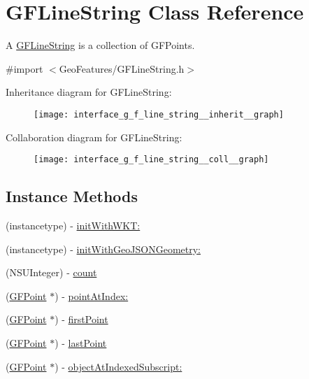 \hypertarget{interface_g_f_line_string}{}\section{G\+F\+Line\+String Class Reference}
\label{interface_g_f_line_string}


A \hyperlink{interface_g_f_line_string}{G\+F\+Line\+String} is a collection of G\+F\+Points.  




{\ttfamily \#import $<$Geo\+Features/\+G\+F\+Line\+String.\+h$>$}



Inheritance diagram for G\+F\+Line\+String\+:\nopagebreak
\begin{figure}[H]
\begin{center}
\leavevmode
\texttt{[image: interface\_g\_f\_line\_string\_\_inherit\_\_graph]}
\end{center}
\end{figure}


Collaboration diagram for G\+F\+Line\+String\+:\nopagebreak
\begin{figure}[H]
\begin{center}
\leavevmode
\texttt{[image: interface\_g\_f\_line\_string\_\_coll\_\_graph]}
\end{center}
\end{figure}
\subsection*{Instance Methods}
\begin{DoxyCompactItemize}
\item 
(instancetype) -\/ \hyperlink{interface_g_f_line_string_a261a4d08fe5cb35f935d265c3a97f453}{init\+With\+W\+K\+T\+:}
\item 
(instancetype) -\/ \hyperlink{interface_g_f_line_string_ad7a913bc12b6099982229190d1debd71}{init\+With\+Geo\+J\+S\+O\+N\+Geometry\+:}
\item 
(N\+S\+U\+Integer) -\/ \hyperlink{interface_g_f_line_string_a58fc2980cff73581d57943a64d60ddba}{count}
\item 
(\hyperlink{interface_g_f_point}{G\+F\+Point} $\ast$) -\/ \hyperlink{interface_g_f_line_string_a51963123a916fd666131859f571e2609}{point\+At\+Index\+:}
\item 
(\hyperlink{interface_g_f_point}{G\+F\+Point} $\ast$) -\/ \hyperlink{interface_g_f_line_string_a1fc7f9d3388d5237cb824573e8f6f71f}{first\+Point}
\item 
(\hyperlink{interface_g_f_point}{G\+F\+Point} $\ast$) -\/ \hyperlink{interface_g_f_line_string_aa9db281010dcfe2ab30b697710859dde}{last\+Point}
\item 
(\hyperlink{interface_g_f_point}{G\+F\+Point} $\ast$) -\/ \hyperlink{interface_g_f_line_string_a0711dbf3ae2b60f3f4d447578f544323}{object\+At\+Indexed\+Subscript\+:}
\end{DoxyCompactItemize}
